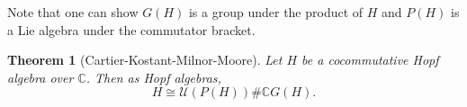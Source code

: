 \documentclass[12pt,a4paper]{article}
\newtheorem{theorem}{Theorem}[section]
\newcommand\1{_{(1)}}
\newcommand\2{_{(2)}}
\begin{document}
Note that one can show $G(H)$ is a group under the product of $H$ and $P(H)$ is a Lie algebra under the commutator bracket.

\begin{theorem}[Cartier-Kostant-Milnor-Moore]
Let $H$ be a cocommutative Hopf algebra over $\mathbb{C}$.
Then as Hopf algebras,
\[
H\cong \mathcal{U}(P(H))\# \mathbb{C}G(H).    
\]
\end{theorem}
\end{document}
